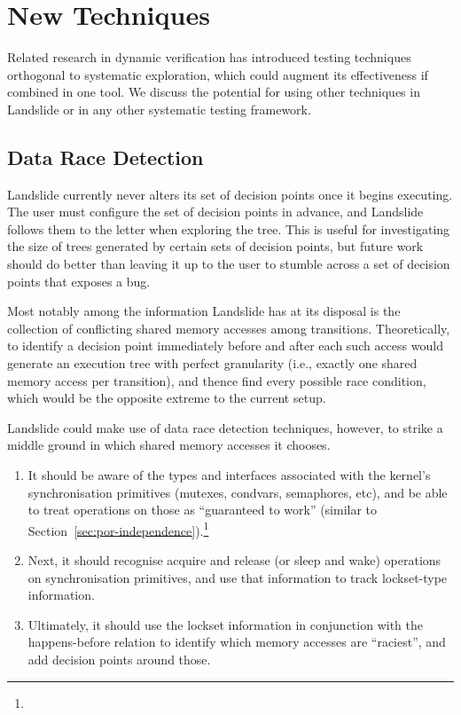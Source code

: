\section{New Techniques}
\label{sec:future-new}

Related research in dynamic verification has introduced testing techniques orthogonal to systematic exploration, which could augment its effectiveness if combined in one tool. We discuss the potential for using other techniques in Landslide or in any other systematic testing framework.

\subsection{Data Race Detection}
\label{sec:future-analysis}

Landslide currently never alters its set of decision points once it begins executing. The user must configure the set of decision points in advance, and Landslide follows them to the letter when exploring the tree. This is useful for investigating the size of trees generated by certain sets of decision points, but future work should do better than leaving it up to the user to stumble across a set of decision points that exposes a bug.

Most notably among the information Landslide has at its disposal is the collection of conflicting shared memory accesses among transitions. Theoretically, to identify a decision point immediately before and after each such access would generate an execution tree with perfect granularity (i.e., exactly one shared memory access per transition), and thence find every possible race condition, which would be the opposite extreme to the current setup.

Landslide could make use of data race detection techniques\cite{datacollider}, however, to strike a middle ground in which shared memory accesses it chooses.
\begin{enumerate}
	\item It should be aware of the types and interfaces associated with the kernel's synchronisation primitives (mutexes, condvars, semaphores, etc), and be able to treat operations on those as ``guaranteed to work'' (similar to Section~\ref{sec:por-independence}).\footnote{
	}
	\item Next, it should recognise acquire and release (or sleep and wake) operations on synchronisation primitives, and use that information to track lockset-type information.
	\item Ultimately, it should use the lockset information in conjunction with the happens-before relation to identify which memory accesses are ``raciest'', and add decision points around those.
\end{enumerate}

